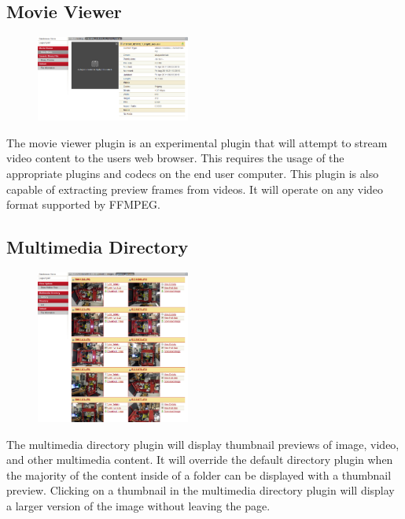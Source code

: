 \documentclass[10pt]{article}
\begin{document}
\endgroup

\hfill \break

\begingroup
\setlength\intextsep{0pt}
\subsection{Movie Viewer}
\begin{figure}
		\includegraphics[width=0.45\textwidth]{Movie_Viewer.png}
\end{figure}
The movie viewer plugin is an experimental plugin that will attempt to stream video content to the users web browser.  This requires the usage of the appropriate plugins and codecs on the end user computer.  This plugin is also capable of extracting preview frames from videos.  It will operate on any video format supported by FFMPEG.

\endgroup

\clearpage
\begingroup
\setlength\intextsep{0pt}
\subsection{Multimedia Directory}
\begin{figure}
		\includegraphics[width=0.45\textwidth]{Multimedia_Directory.png}
\end{figure}
The multimedia directory plugin will display thumbnail previews of image, video, and other multimedia content.  It will override the default directory plugin when the majority of the content inside of a folder can be displayed with a thumbnail preview.  Clicking on a thumbnail in the multimedia directory plugin will display a larger version of the image without leaving the page. 
\end{document}
